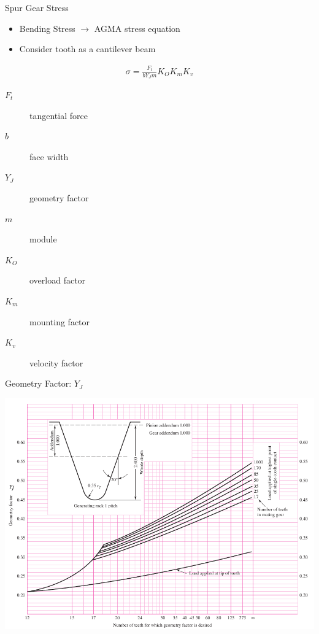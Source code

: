 \documentclass[10pt, svgnames]{beamer}
\begin{document}
\begin{frame}[label={sec:org15e82c8}]{Spur Gear Stress}
\begin{itemize}
\item Bending Stress \(\rightarrow\) AGMA stress equation

\item Consider tooth as a cantilever beam
\end{itemize}

\begin{align*}
  \sigma = \frac{F_{t}}{bY_{J}m} K_{O} K_{m} K_{v}
\end{align*}

\begin{description}
\item[{\(F_{t}\)}] tangential force

\item[{\(b\)}] face width

\item[{\(Y_{J}\)}] geometry factor

\item[{\(m\)}] module

\item[{\(K_{O}\)}] overload factor

\item[{\(K_{m}\)}] mounting factor

\item[{\(K_{v}\)}] velocity factor
\end{description}
\end{frame}

\begin{frame}[label={sec:org6d941ff}]{Geometry Factor: \(Y_{J}\)}
\begin{center}
\includegraphics[width=.9\linewidth]{pictures/geometry-factor.png}
\end{center}
\end{frame}
\end{document}

